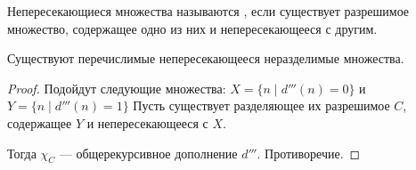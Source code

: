 \begin{defn}
	Непересекающиеся множества называются , если существует разрешимое множество, содержащее одно из них и непересекающееся с другим.
\end{defn}

\begin{cor}
    Существуют перечислимые непересекающееся неразделимые множества. 
\end{cor}
\begin{proof}
	Подойдут следующие множества:
	$ X = \{ n \mid d'''(n) = 0\}$ и  $ Y = \{n \mid d'''(n) =1 \}$
Пусть существует разделяющее их разрешимое $ C$, содержащее $ Y$ и непересекающееся с $ X$.

Тогда $ \chi_C$ --- общерекурсивное дополнение $ d'''$.  Противоречие. 
\end{proof}

